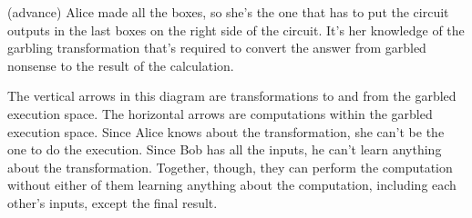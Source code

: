 \documentclass[14pt, table]{beamer}
\begin{document}
{(advance) Alice made all the boxes, so she's the one that has to put the circuit outputs in the last boxes on the right side of the circuit. It's her knowledge of the garbling transformation that's required to convert the answer from garbled nonsense to the result of the calculation.

The vertical arrows in this diagram are transformations to and from the garbled execution space. The horizontal arrows are computations within the garbled execution space. Since Alice knows about the transformation, she can't be the one to do the execution. Since Bob has all the inputs, he can't learn anything about the transformation. Together, though, they can perform the computation without either of them learning anything about the computation, including each other's inputs, except the final result.

}


\maketitle
{}
\end{document}
